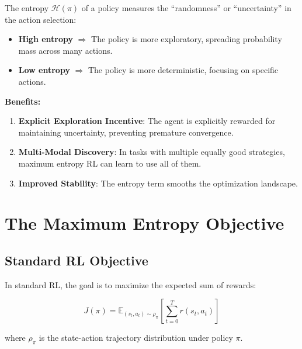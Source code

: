 \documentclass[12pt,a4paper]{article}
\theoremstyle{noteplain}
\theoremstyle{noteexercise}
\begin{document}
The entropy $\mathcal{H}(\pi)$ of a policy measures the ``randomness'' or ``uncertainty'' in the action selection:

\begin{itemize}
  \item \textbf{High entropy} $\Longrightarrow$ The policy is more exploratory, spreading probability mass across many actions.
  \item \textbf{Low entropy} $\Longrightarrow$ The policy is more deterministic, focusing on specific actions.
\end{itemize}

\textbf{Benefits:}

\begin{enumerate}
  \setlength{\itemsep}{0.3em}
  \item \textbf{Explicit Exploration Incentive}: The agent is explicitly rewarded for maintaining uncertainty, preventing premature convergence.
  \item \textbf{Multi-Modal Discovery}: In tasks with multiple equally good strategies, maximum entropy RL can learn to use all of them.
  \item \textbf{Improved Stability}: The entropy term smooths the optimization landscape.
\end{enumerate}






\section{The Maximum Entropy Objective}\label{sec:maxent-obj}



\subsection{Standard RL Objective}\label{ssec:standard-obj}



In standard RL, the goal is to maximize the expected sum of rewards:

$$J(\pi) = \mathbb{E}_{(s_t, a_t) \sim \rho_\pi}\left[\sum_{t=0}^{T} r(s_t, a_t)\right]$$

where $\rho_\pi$ is the state-action trajectory distribution under policy $\pi$.
\end{document}
